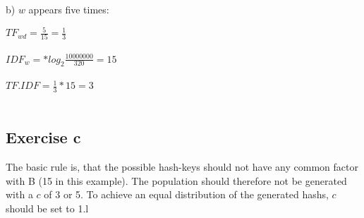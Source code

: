 \documentclass[]{scrartcl}
\begin{document}
b) $w$ appears five times: \\
\begin{addmargin}[25pt]{0pt} 
$TF_{wd} = \frac{5}{15} = \frac{1}{3}$\\\\
$IDF_w = * log_2\frac{10000000}{320} = 15$\\\\
$TF.IDF = \frac{1}{3} * 15 = 3$\\\\
\end{addmargin}

\subsection*{Exercise c}

The basic rule is, that the possible hash-keys should not have any common factor with B (15 in this example). The population should therefore not be generated with a $c$ of 3 or 5. To achieve an equal distribution of the generated hashs, $c$ should be set to 1.l
\end{document}
